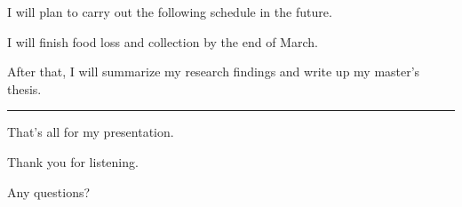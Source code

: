 \documentclass{article}
\begin{document}
\begin{multicols}{2}
\begin{spacing}{1.1}
I will plan to carry out the following schedule in the future.

I will finish food loss and collection by the end of March.

After that, I will summarize my research findings and write up my master's thesis.

\noindent\rule{0.2\textwidth}{1pt}

That's all for my presentation.

Thank you for listening.

Any questions?

\end{spacing}
\end{multicols}
\end{document}

